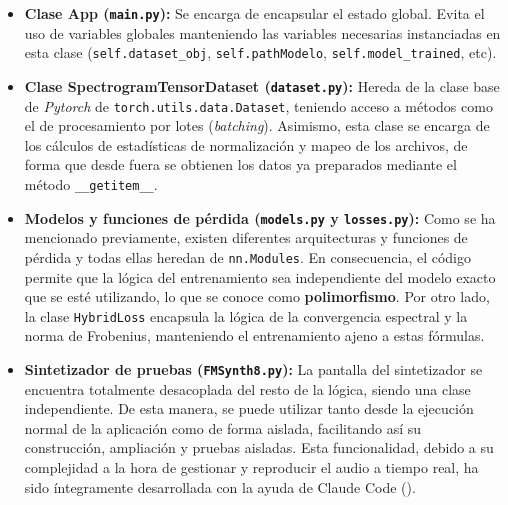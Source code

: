\begin{itemize}
    \item \textbf{Clase App (\texttt{main.py}): } Se encarga de encapsular el estado global. Evita el uso de variables globales manteniendo las variables necesarias instanciadas en esta clase (\texttt{self.dataset\_obj}, \texttt{self.pathModelo}, \texttt{self.model\_trained}, etc).
    \item \textbf{Clase SpectrogramTensorDataset (\texttt{dataset.py}): } Hereda de la clase base de \textit{Pytorch} de \texttt{torch.utils.data.Dataset}, teniendo acceso a métodos como el de procesamiento por lotes (\textit{batching}). Asimismo, esta clase se encarga de los cálculos de estadísticas de normalización y mapeo de los archivos, de forma que desde fuera se obtienen los datos ya preparados mediante el método \texttt{\_\_getitem\_\_}. 
    \item \textbf{Modelos y funciones de pérdida (\texttt{models.py} y \texttt{losses.py}): } Como se ha mencionado previamente, existen diferentes arquitecturas y funciones de pérdida y todas ellas heredan de \texttt{nn.Modules}. En consecuencia, el código permite que la lógica del entrenamiento sea independiente del modelo exacto que se esté utilizando, lo que se conoce como \textbf{polimorfismo}. Por otro lado, la clase \texttt{HybridLoss} encapsula la lógica de la convergencia espectral y la norma de Frobenius, manteniendo el entrenamiento ajeno a estas fórmulas. 
    \item \textbf{Sintetizador de pruebas (\texttt{FMSynth8.py}): } La pantalla del sintetizador se encuentra totalmente desacoplada del resto de la lógica, siendo una clase independiente. De esta manera, se puede utilizar tanto desde la ejecución normal de la aplicación como de forma aislada, facilitando así su construcción, ampliación y pruebas aisladas. Esta funcionalidad, debido a su complejidad a la hora de gestionar y reproducir el audio a tiempo real, ha sido íntegramente desarrollada con la ayuda de Claude Code (\cite{claude_code}).
\end{itemize}




